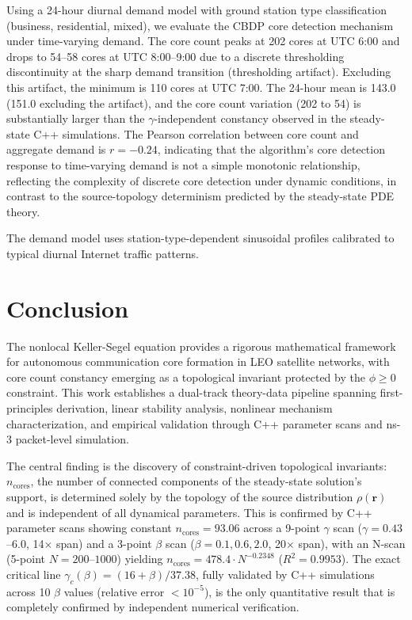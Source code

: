 \documentclass[sn-nature,pdflatex]{sn-jnl}
\begin{document}
Using a 24-hour diurnal demand model with ground station type classification (business, residential, mixed), we evaluate the CBDP core detection mechanism under time-varying demand.
The core count peaks at 202 cores at UTC 6:00 and drops to 54--58 cores at UTC 8:00--9:00 due to a discrete thresholding discontinuity at the sharp demand transition (thresholding artifact). Excluding this artifact, the minimum is 110 cores at UTC 7:00. The 24-hour mean is 143.0 (151.0 excluding the artifact), and the core count variation (202 to 54) is substantially larger than the $\gamma$-independent constancy observed in the steady-state C++ simulations. The Pearson correlation between core count and aggregate demand is $r = -0.24$, indicating that the algorithm's core detection response to time-varying demand is not a simple monotonic relationship, reflecting the complexity of discrete core detection under dynamic conditions, in contrast to the source-topology determinism predicted by the steady-state PDE theory.

The demand model uses station-type-dependent sinusoidal profiles calibrated to typical diurnal Internet traffic patterns.

\section{Conclusion}
\label{sec:conclusion}

The nonlocal Keller-Segel equation provides a rigorous mathematical framework for autonomous communication core formation in LEO satellite networks, with core count constancy emerging as a topological invariant protected by the $\phi \geq 0$ constraint. This work establishes a dual-track theory-data pipeline spanning first-principles derivation, linear stability analysis, nonlinear mechanism characterization, and empirical validation through C++ parameter scans and ns-3 packet-level simulation.

The central finding is the discovery of constraint-driven topological invariants: $n_{\text{cores}}$, the number of connected components of the steady-state solution's support, is determined solely by the topology of the source distribution $\rho(\mathbf{r})$ and is independent of all dynamical parameters. This is confirmed by C++ parameter scans showing constant $n_{\text{cores}} = 93.06$ across a 9-point $\gamma$ scan ($\gamma=0.43$--$6.0$, 14$\times$ span) and a 3-point $\beta$ scan ($\beta=0.1, 0.6, 2.0$, 20$\times$ span), with an N-scan (5-point $N=200$--$1000$) yielding $n_{\text{cores}} = 478.4 \cdot N^{-0.2348}$ ($R^2=0.9953$). The exact critical line $\gamma_c(\beta) = (16+\beta)/37.38$, fully validated by C++ simulations across 10 $\beta$ values (relative error $<10^{-5}$), is the only quantitative result that is completely confirmed by independent numerical verification.
\end{document}

